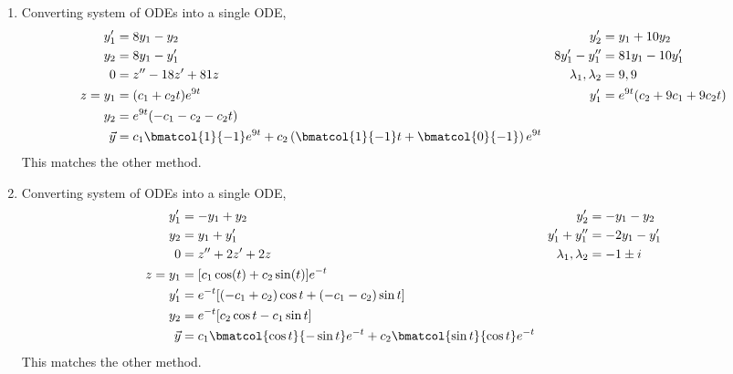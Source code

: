 \begin{enumerate}
    \item Converting system of ODEs into a single ODE,
          \begin{align}
              y_1'                 & = 8y_1 - y_2                 &
              y_2'                 & = y_1 + 10y_2                  \\
              y_2                  & = 8y_1 - y_1'                &
              8y_1' - y_1''        & = 81y_1 - 10y_1'               \\
              0                    & = z'' - 18z' + 81z           &
              \lambda_1, \lambda_2 & = 9, 9                         \\
              z = y_1              & = (c_1 + c_2t)e^{9t}         &
              y_1'                 & = e^{9t}(c_2 + 9c_1 + 9c_2t)   \\
              y_2                  & = e^{9t}(-c_1 - c_2 - c_2t)    \\
              \vec{y}              & = c_1 \bmatcol{1}{-1}e^{9t}
              + c_2\left( \bmatcol{1}{-1}t + \bmatcol{0}{-1} \right)e^{9t}
          \end{align}
          This matches the other method.

    \item Converting system of ODEs into a single ODE,
          \begin{align}
              y_1'                 & = -y_1 + y_2                               &
              y_2'                 & = -y_1 - y_2                                 \\
              y_2                  & = y_1 + y_1'                               &
              y_1' + y_1''         & = -2y_1 - y_1'                               \\
              0                    & = z'' + 2z' + 2z                           &
              \lambda_1, \lambda_2 & = -1 \pm i                                   \\
              z = y_1              & = [c_1 \cos(t) + c_2\sin(t)]e^{-t}           \\
              y_1'                 & = e^{-t}[(-c_1 + c_2)\cos t + (-c_1 - c_2)
              \sin t]                                                             \\
              y_2                  & = e^{-t}[c_2 \cos t - c_1 \sin t]            \\
              \vec{y}              & = c_1 \bmatcol{\cos t}{-\sin t}e^{-t}
              + c_2\bmatcol{\sin t}{\cos t}e^{-t}
          \end{align}
          This matches the other method.


\end{enumerate}
